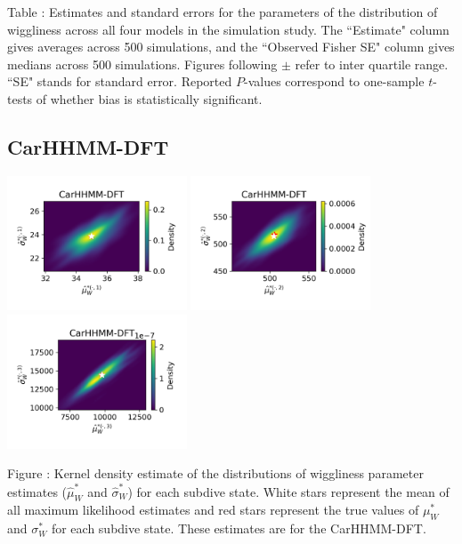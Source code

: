 \documentclass{article}
\begin{document}
        \noindent Table : Estimates and standard errors for the parameters of the distribution of wiggliness across all four models in the simulation study. The ``Estimate" column gives averages across 500 simulations, and the ``Observed Fisher SE" column gives medians across 500 simulations. Figures following $\pm$ refer to inter quartile range. ``SE" stands for standard error. Reported $P$-values correspond to one-sample $t$-tests of whether bias is statistically significant.
        \addtocounter{tablenum}{1}
        
        \newpage
    
        \subsection{CarHHMM-DFT}
        \begin{center}
        \includegraphics[width=2.1in]{../Plots/hhmm_FV_MLE_density_FoVeDBA_0_0.png}
        \includegraphics[width=2.1in]{../Plots/hhmm_FV_MLE_density_FoVeDBA_0_1.png}
        \includegraphics[width=2.1in]{../Plots/hhmm_FV_MLE_density_FoVeDBA_0_2.png}
        \end{center}
        
        \noindent Figure : Kernel density estimate of the distributions of wiggliness parameter estimates ($\hat \mu^*_W$ and $\hat \sigma^*_W$) for each subdive state. White stars represent the mean of all maximum likelihood estimates and red stars represent the true values of $\mu^*_W$ and $\sigma^*_W$ for each subdive state. These estimates are for the CarHHMM-DFT.
        \addtocounter{fignum}{1}
        
\end{document}
